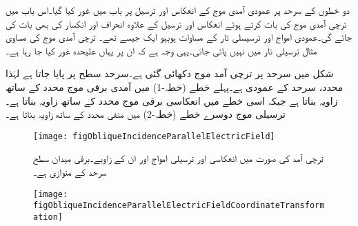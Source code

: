 دو خطوں کے سرحد پر عمودی آمدی موج کے انعکاس اور ترسیل پر باب  میں غور کیا گیا۔اس باب میں ترچی آمدی موج کی بات کرتے ہوئے انعکاس اور ترسیل کے علاوہ انحراف اور انکسار کی بھی بات کی جائے گی۔عمودی امواج اور ترسیسلی تار کے مساوات ہوبہو ایک جیسے تھے۔ ترچی آمدی موج کی مساوی مثال ترسیلی تار میں نہیں پائی جاتی۔یہی وجہ ہے کہ ان پر یہاں علیحدہ  غور کیا جا رہا ہے۔

شکل میں سرحد پر ترچی آمد موج دکھائی گئی ہے۔سرحد  سطح پر پایا جاتا ہے لہٰذا  محدد، سرحد کے عمودی ہے۔پہلے خطے (خطہ-1) میں آمدی برقی موج  محدد کے ساتھ  زاویہ بناتا ہے جبکہ اسی خطے میں انعکاسی برقی موج  محدد کے ساتھ  زاویہ بناتا ہے۔ترسیلی موج دوسرے خطے (خطہ-2) میں منفی  محدد کے ساتھ  زاویہ بناتا ہے۔
\begin{figure}
\centering
\texttt{[image: figObliqueIncidenceParallelElectricField]}
\caption{ترچی آمد کی صورت میں انعکاسی اور ترسیلی امواج اور ان کے زاویے۔برقی میدان سطح سرحد کے متوازی ہے۔}
\label{شکل_ترچی_آمد_متوازی_برقی_میدان_عمومی_شکل}
\end{figure}

\begin{figure}
\centering
\texttt{[image: figObliqueIncidenceParallelElectricFieldCoordinateTransformation]}
\caption{}
\label{شکل_ترچی_محدد_کی_تبدیلی}
\end{figure}
